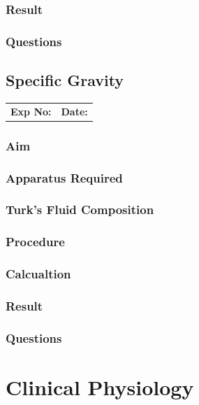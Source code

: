 \documentclass[a4paper,12pt]{book}
\begin{document}
					\section*{Result}
					\section*{Questions}

					\chapter*{\centering Specific Gravity}

					\begin{tabular}{p{5in} p{1in}}
						\textbf{Exp No:}  & \textbf{Date:}\\
					\end{tabular}

					\section*{Aim}


					\section*{Apparatus Required}
					\section*{Turk's Fluid Composition}
					\section*{Procedure}
					\section*{Calcualtion}
					\section*{Result}
					\section*{Questions}


					\part{Clinical Physiology}


				
\end{document}
